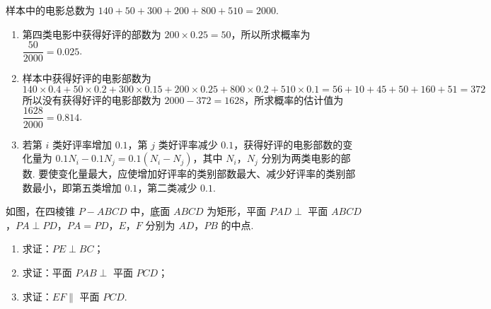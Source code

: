 \begin{solution}
样本中的电影总数为 \(140+50+300+200+800+510=2000\).

\begin{enumerate}
\item 第四类电影中获得好评的部数为 \(200\times0.25=50\)，所以所求概率为 \(\dfrac{50}{2000}=0.025\).
\item 样本中获得好评的电影部数为
\[
140\times0.4+50\times0.2+300\times0.15+200\times0.25+800\times0.2+510\times0.1=56+10+45+50+160+51=372
\]
所以没有获得好评的电影部数为 \(2000-372=1628\)，所求概率的估计值为 \(\dfrac{1628}{2000}=0.814\).
\item 若第 \(i\) 类好评率增加 \(0.1\)，第 \(j\) 类好评率减少 \(0.1\)，获得好评的电影部数的变化量为 \(0.1N_i-0.1N_j=0.1(N_i-N_j)\)，其中 \(N_i\)，\(N_j\) 分别为两类电影的部数. 要使变化量最大，应使增加好评率的类别部数最大、减少好评率的类别部数最小，即第五类增加 \(0.1\)，第二类减少 \(0.1\).
\end{enumerate}
\end{solution}


\begin{problem}

如图，在四棱锥 \(P-ABCD\) 中，底面 \(ABCD\) 为矩形，平面 \(PAD\perp\) 平面 \(ABCD\)，\(PA\perp PD\)，\(PA=PD\)，\(E\)，\(F\) 分别为 \(AD\)，\(PB\) 的中点.

\begin{enumerate}
\item 求证：\(PE\perp BC\)；
\item 求证：平面 \(PAB\perp\) 平面 \(PCD\)；
\item 求证：\(EF\parallel\) 平面 \(PCD\).
\end{enumerate}

\end{problem}

